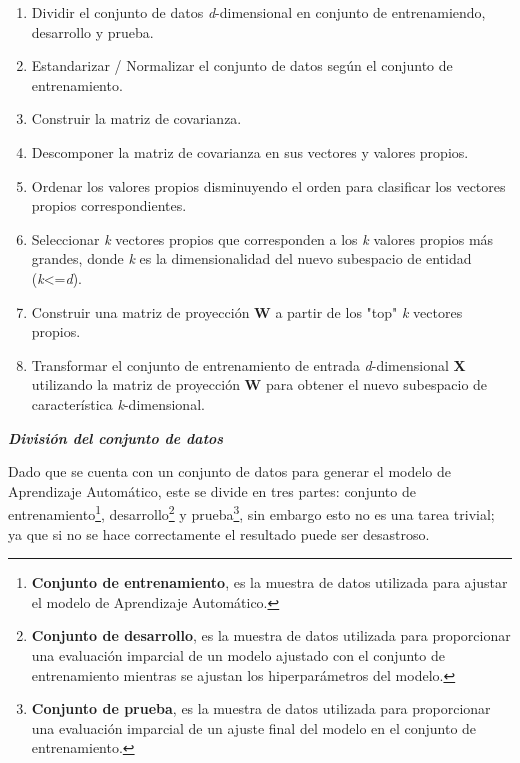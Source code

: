 \begin{enumerate}

\item Dividir el conjunto de datos \textit{d}-dimensional en conjunto de entrenamiendo, desarrollo y prueba.
\item Estandarizar / Normalizar el conjunto de datos seg\'{u}n el conjunto de entrenamiento.
\item Construir la matriz de covarianza.
\item Descomponer la matriz de covarianza en sus vectores y valores propios.
\item Ordenar los valores propios disminuyendo el orden para clasificar los vectores propios correspondientes.
\item Seleccionar \textit{k} vectores propios que corresponden a los \textit{k} valores propios m\'{a}s grandes, donde \textit{k} es la dimensionalidad del nuevo subespacio de entidad (\textit{k}<=\textit{d}).
\item Construir una matriz de proyecci\'{o}n \textbf{W} a partir de los "top" \textit{k} vectores propios.
\item Transformar el conjunto de entrenamiento de entrada \textit{d}-dimensional \textbf{X} utilizando la matriz de proyecci\'{o}n \textbf{W} para obtener el nuevo subespacio de caracter\'{i}stica \textit{k}-dimensional.

\end{enumerate}

\vspace{5mm} %

\textbf{\textit{Divisi\'{o}n del conjunto de datos}}

\vspace{5mm} %

Dado que se cuenta con un conjunto de datos para generar el modelo de Aprendizaje Autom\'{a}tico, este se divide en tres partes: conjunto de entrenamiento\footnote{\textbf{Conjunto de entrenamiento}, es la muestra de datos utilizada para ajustar el modelo de Aprendizaje Autom\'{a}tico.}, desarrollo\footnote{\textbf{Conjunto de desarrollo}, es la muestra de datos utilizada para proporcionar una evaluaci\'{o}n imparcial de un modelo ajustado con el conjunto de entrenamiento mientras se ajustan los hiperpar\'{a}metros del modelo.} y prueba\footnote{\textbf{Conjunto de prueba}, es la muestra de datos utilizada para proporcionar una evaluaci\'{o}n imparcial de un ajuste final del modelo en el conjunto de entrenamiento.}, sin embargo esto no es una tarea trivial; ya que si no se hace correctamente el resultado puede ser desastroso.

